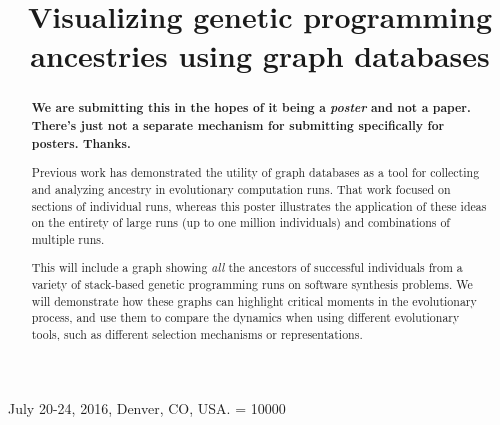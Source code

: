 \documentclass{sig-alternate}
\begin{document}
 {July 20-24, 2016, Denver, CO, USA.}
\widowpenalty = 10000
    
\title{Visualizing genetic programming ancestries using graph databases}

%
\maketitle

\begin{abstract}

\textbf{We are submitting this in the hopes of it being a \textit{poster} and not a paper. There's just not a separate mechanism for submitting specifically for posters. Thanks.}

Previous work has demonstrated the utility of graph databases as a tool for collecting and analyzing ancestry in evolutionary computation runs. That work focused on sections of individual runs, whereas this poster illustrates the application of these ideas on the entirety of large runs (up to one million individuals) and combinations of multiple runs.

This will include a graph showing \emph{all} the ancestors of successful individuals from a variety of stack-based genetic programming runs on software synthesis problems. We will demonstrate how these graphs can highlight critical moments in the evolutionary process, and use them to compare the dynamics when using different evolutionary tools, such as different selection mechanisms or representations.

\end{abstract}
\end{document}
